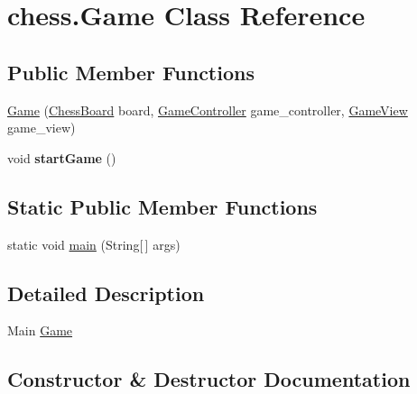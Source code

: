\hypertarget{classchess_1_1_game}{}\section{chess.\+Game Class Reference}
\label{classchess_1_1_game}
\subsection*{Public Member Functions}
\begin{DoxyCompactItemize}
\item 
\hyperlink{classchess_1_1_game_a1027946d6b89410913542ffefde89048}{Game} (\hyperlink{classchessboard_1_1_chess_board}{Chess\+Board} board, \hyperlink{classchess_1_1_game_controller}{Game\+Controller} game\+\_\+controller, \hyperlink{classchess_1_1_game_view}{Game\+View} game\+\_\+view)
\item 
\hypertarget{classchess_1_1_game_a62625ed6fdf31f366b4d9fa7b057ce11}{}void {\bfseries start\+Game} ()\label{classchess_1_1_game_a62625ed6fdf31f366b4d9fa7b057ce11}

\end{DoxyCompactItemize}
\subsection*{Static Public Member Functions}
\begin{DoxyCompactItemize}
\item 
static void \hyperlink{classchess_1_1_game_a26b35a6e1a16f410fa2182794ffce9ae}{main} (String\mbox{[}$\,$\mbox{]} args)
\end{DoxyCompactItemize}


\subsection{Detailed Description}
Main \hyperlink{classchess_1_1_game}{Game} 

\subsection{Constructor \& Destructor Documentation}
\hypertarget{classchess_1_1_game_a1027946d6b89410913542ffefde89048}{}
